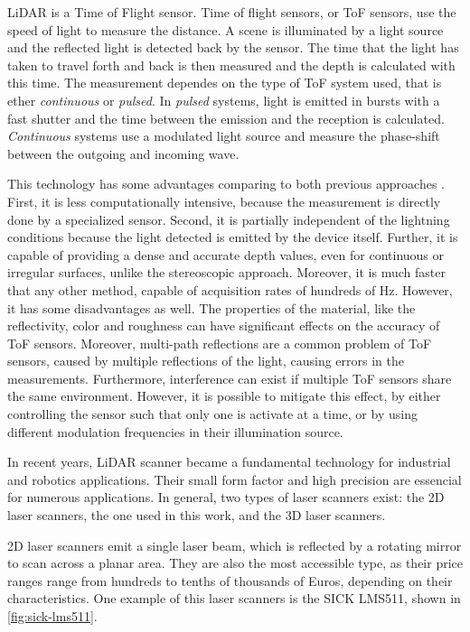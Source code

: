 LiDAR is a Time of Flight sensor. Time of flight sensors, or ToF sensors, use the speed of light to measure the distance. A scene is illuminated by a light source and the reflected light is detected back by the sensor. The time that the light has taken to travel forth and back is then measured and the depth is calculated with this time. The measurement dependes on the type of ToF system used, that is ether \textit{continuous} or \textit{pulsed}. In \textit{pulsed} systems, light is emitted in bursts with a fast shutter and the time between the emission and the reception is calculated. \textit{Continuous} systems use a modulated light source and measure the phase-shift between the outgoing and incoming wave.

This technology has some advantages comparing to both previous approaches \cite{zollhoefer18}. First, it is less computationally intensive, because the measurement is directly done by a specialized sensor. Second, it is partially independent of the lightning conditions because the light detected is emitted by the device itself. Further, it is capable of providing a dense and accurate depth values, even for continuous or irregular surfaces, unlike the stereoscopic approach. Moreover, it is much faster that any other method, capable of acquisition rates of hundreds of \si{\hertz}. However, it has some disadvantages as well. The properties of the material, like the reflectivity, color and roughness can have significant effects on the accuracy of ToF sensors. Moreover, multi-path reflections are a common problem of ToF sensors, caused by multiple reflections of the light, causing errors in the measurements. Furthermore, interference can exist if multiple ToF sensors share the same environment. However, it is possible to mitigate this effect, by either controlling the sensor such that only one is activate at a time, or by using different modulation frequencies in their illumination source.

In recent years, LiDAR scanner became a fundamental technology for industrial and robotics applications. Their small form factor and high precision are essencial for numerous applications. In general, two types of laser scanners exist: the 2D laser scanners, the one used in this work, and the 3D laser scanners. 

2D laser scanners emit a single laser beam, which is reflected by a rotating mirror to scan across a planar area. They are also the most accessible type, as their price ranges range from hundreds to tenths of thousands of Euros, depending on their characteristics. One example of this laser scanners is the SICK LMS511, shown in \cref{fig:sick-lms511}. 

